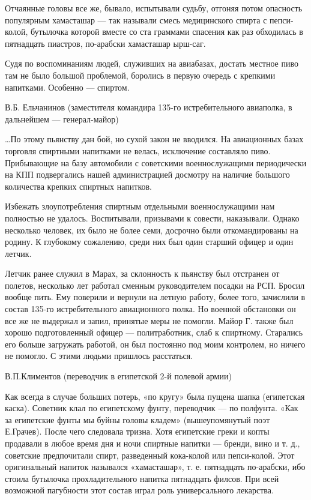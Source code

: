 \begin{textcitation}
	Отчаянные головы все же, бывало, испытывали судьбу, отгоняя потом опасность популярным хамасташар — так называли смесь медицинского спирта с пепси-колой, бутылочка которой вместе со ста граммами спасения как раз обходилась в пятнадцать пиастров, по-арабски хамасташар ырш-саг.
\end{textcitation}

Судя по воспоминаниям людей, служивших на авиабазах, достать местное пиво там не было большой проблемой, боролись в первую очередь с крепкими напитками. Особенно — спиртом.

В.Б. Ельчанинов (заместителя командира 135-го истребительного авиаполка, в дальнейшем — генерал-майор)

\begin{textcitation}
	…По этому пьянству дан бой, но сухой закон не вводился. На авиационных базах торговля спиртными напитками не велась, исключение составляло пиво. Прибывающие на базу автомобили с советскими военнослужащими периодически на КПП подвергались нашей администрацией досмотру на наличие большого количества крепких спиртных напитков. 
	
	Избежать злоупотребления спиртным отдельными военнослужащими нам полностью не удалось. Воспитывали, призывами к совести, наказывали. Однако несколько человек, их было не более семи, досрочно были откомандированы на родину. К глубокому сожалению, среди них был один старший офицер и один летчик.
	
	Летчик ранее служил в Марах, за склонность к пьянству был отстранен от полетов, несколько лет работал сменным руководителем посадки на РСП. Бросил вообще пить. Ему поверили и вернули на летную работу, более того, зачислили в состав 135-го истребительного авиационного полка. Но военной обстановки он все же не выдержал и запил, принятые меры не помогли. Майор Г. также был хорошо подготовленный офицер — политработник, слаб к спиртному. Старались его больше загружать работой, он был постоянно под моим контролем, но ничего не помогло. С этими людьми пришлось расстаться.
\end{textcitation}

В.П.Климентов (переводчик в египетской 2-й полевой армии)

\begin{textcitation}
	Как всегда в случае больших потерь, «по кругу» была пущена шапка (египетская каска). Советник клал по египетскому фунту, переводчик — по полфунта. «Как за египетские фунты мы буйны головы кладем» (вышеупомянутый поэт Е.Грачев). После чего следовала тризна. Хотя египетские греки и копты продавали в любое время дня и ночи спиртные напитки — бренди, вино и т. д., советские предпочитали спирт, разведенный кока-колой или пепси-колой. Этот оригинальный напиток назывался «хамасташар», т. е. пятнадцать по-арабски, ибо стоила бутылочка прохладительного напитка пятнадцать филсов. При всей возможной пагубности этот состав играл роль универсального лекарства. 
\end{textcitation}

